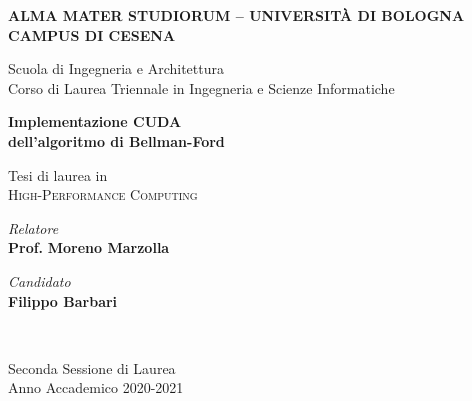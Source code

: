 \documentclass[12pt,a4paper]{book} %
\begin{document}
	
	\begin{titlepage}
		\begin{center}
			\large
			\textbf{ALMA MATER STUDIORUM -- UNIVERSITÀ DI BOLOGNA \\ CAMPUS DI CESENA} \\
			\noindent\hrulefill
			\vspace{0.4cm}
			
			\Large
			Scuola di Ingegneria e Architettura \\
			Corso di Laurea Triennale in Ingegneria e Scienze Informatiche
			
			\Huge
			\vspace{4cm}
			\textbf{
				Implementazione CUDA \\
				dell'algoritmo di Bellman-Ford
			}
			
			\large
			\vspace{1cm}
			Tesi di laurea in \\
			\textsc{High-Performance Computing}
			
			\vspace{5.5cm}
			\begin{minipage}[t]{0.64\textwidth}
				\begin{flushleft}
					\textit{Relatore} \\ 
					\textbf{Prof.} \textbf{Moreno Marzolla}
				\end{flushleft}
			\end{minipage}
			\begin{minipage}[t]{0.34\textwidth}
				\begin{flushright}
					\textit{Candidato} \\ 
					\textbf{Filippo Barbari}
				\end{flushright}
			\end{minipage}\\
			\vfill
			\noindent\hrulefill
			\vspace{0.3cm}
			
			\Large
			Seconda Sessione di Laurea \\
			Anno Accademico 2020-2021
		\end{center}
	\end{titlepage}
	\restoregeometry
	\newpage
	
	\tableofcontents
	\newpage
	
	\listoffigures
	\newpage
	
	\listoftables
	\newpage
	
	\listofalgorithms
	\newpage
	
\end{document}
